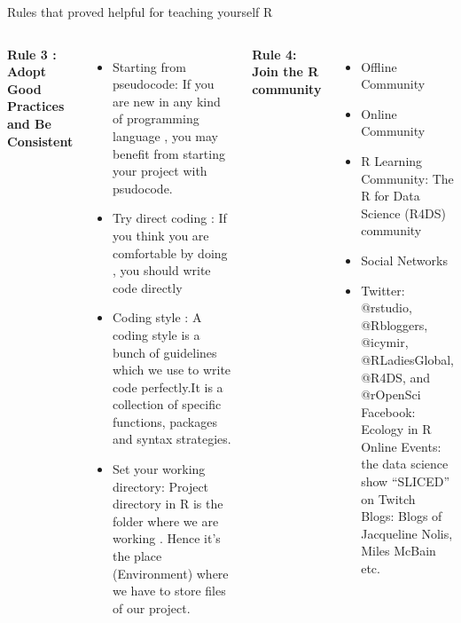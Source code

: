 \documentclass{beamer}
\begin{document}
   \begin{frame}[t]{Rules that proved helpful for teaching yourself R}
		\scriptsize
		
		\begin{columns}[t] 
			 {\textbf {Rule 3 : Adopt Good Practices and Be Consistent}}
				\begin{itemize}
				\item Starting from pseudocode:
				If you are new in any kind of programming  language , you may benefit from starting your project with psudocode.
				
				\item   Try direct coding : If you think you are comfortable by doing , you should write code directly 
				\item   Coding style : A coding style is a  bunch  of guidelines  which we use to write code perfectly.It is a collection of specific functions, packages and syntax strategies.
				\item  Set your working directory: Project directory in R is the folder where   we are working . Hence it’s the place (Environment) where we have to store files of our project.
				
			\end{itemize}
			
			 {\textbf{Rule 4: Join the R community}}
			\begin{itemize}
				\item 	Offline Community 
				\item  	Online Community 
				\item   	R Learning Community:	The R for Data Science (R4DS) community  
				
				\item  	Social Networks  
				
				\item  	Twitter: @rstudio, @Rbloggers, @icymir, @RLadiesGlobal, @R4DS, and @rOpenSci\\
					Facebook: Ecology in R
					Online Events: the data science show “SLICED” on Twitch\\
					Blogs: Blogs of Jacqueline Nolis, Miles McBain etc.
				
			\end{itemize}	
			
		\end{columns}	
		
  \end{frame}
	
\end{document}
